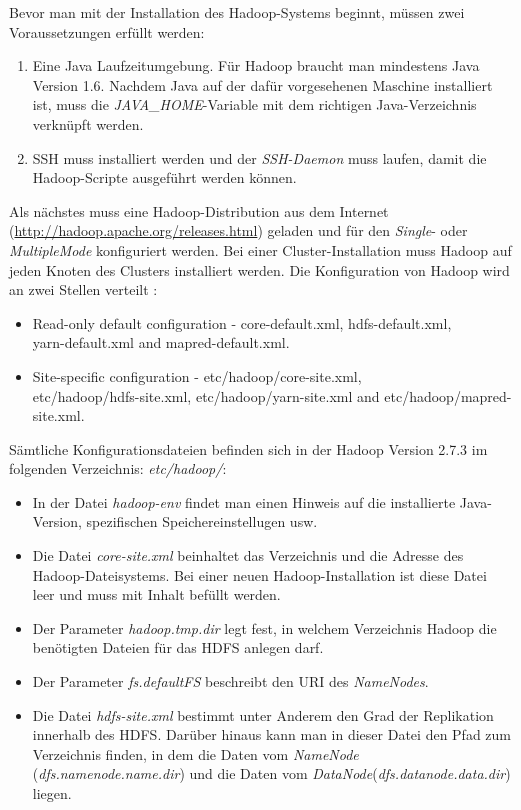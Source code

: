 Bevor man mit der Installation des Hadoop-Systems beginnt, müssen zwei Voraussetzungen erfüllt werden:
\begin{enumerate}
\item Eine Java Laufzeitumgebung. Für Hadoop braucht man mindestens Java Version 1.6.
Nachdem Java auf der dafür vorgesehenen Maschine installiert ist, muss die \textit{JAVA\_HOME}-Variable mit dem richtigen Java-Verzeichnis verknüpft werden.
\item \ac{SSH} muss installiert werden und der \textit{\ac{SSH}-Daemon} muss laufen, damit die Hadoop-Scripte ausgeführt werden können.
\end{enumerate}
Als nächstes muss eine Hadoop-Distribution aus dem Internet (\url{http://hadoop.apache.org/releases.html}) geladen und für den \textit{Single}- oder \textit{MultipleMode} konfiguriert werden. Bei einer Cluster-Installation muss Hadoop auf jeden Knoten des Clusters installiert werden.
Die Konfiguration von Hadoop wird an zwei Stellen verteilt \cite{hadoopConfiguration}:
\begin{itemize}
\item Read-only default configuration - core-default.xml, hdfs-default.xml, \\yarn-default.xml and mapred-default.xml.
\item Site-specific configuration - etc/hadoop/core-site.xml,\\ etc/hadoop/hdfs-site.xml, etc/hadoop/yarn-site.xml and etc/hadoop/mapred-site.xml.
\end{itemize}


Sämtliche Konfigurationsdateien befinden sich in der Hadoop Version 2.7.3 im folgenden Verzeichnis: \textit{etc/hadoop/}:
\begin{itemize}
\item In der Datei \textit{hadoop-env} findet man einen Hinweis auf die installierte Java-Version, spezifischen Speichereinstellugen usw. 
\item Die Datei \textit{core-site.xml} beinhaltet das Verzeichnis und die Adresse des Hadoop-Dateisystems. Bei einer neuen Hadoop-Installation ist diese Datei leer und muss mit Inhalt befüllt werden.
\item Der Parameter \textit{hadoop.tmp.dir} legt fest, in welchem Verzeichnis Hadoop die benötigten Dateien für das HDFS anlegen darf.
\item Der Parameter \textit{fs.defaultFS} beschreibt den \ac{URI} des \textit{NameNodes}.
\item Die Datei \textit{hdfs-site.xml} bestimmt unter Anderem den Grad der Replikation innerhalb des \ac{HDFS}. Darüber hinaus kann man in dieser Datei den Pfad zum Verzeichnis finden, in dem die Daten vom \textit{NameNode} (\textit{dfs.namenode.name.dir}) und die Daten vom \textit{DataNode}(\textit{dfs.datanode.data.dir}) liegen.
\end{itemize}

